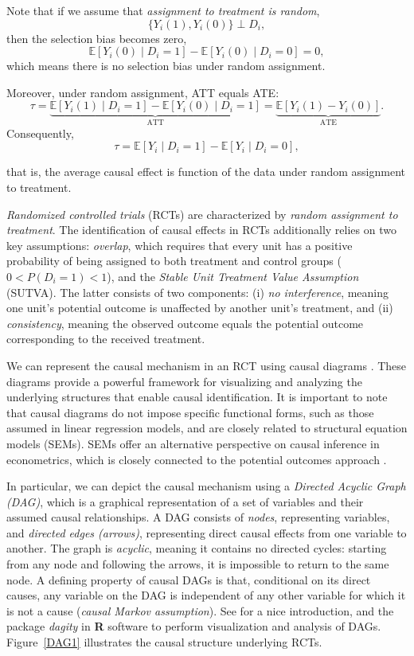 Note that if we assume that \textit{assignment to treatment is random},
\[
\{ Y_i(1), Y_i(0) \} \perp D_i,
\]
then the selection bias becomes zero,
\[
\mathbb{E}[Y_i(0) \mid D_i = 1] - \mathbb{E}[Y_i(0) \mid D_i = 0] = 0,
\]
which means there is no selection bias under random assignment.

Moreover, under random assignment, ATT equals ATE:
\[
\tau = \underbrace{\mathbb{E}[Y_i(1)\mid D_i=1]-\mathbb{E}[Y_i(0)\mid D_i=1]}_{\text{ATT}} 
= \underbrace{\mathbb{E}[Y_i(1)-Y_i(0)]}_{\text{ATE}}.
\]
Consequently,
\begin{equation}
	\tau=\mathbb{E}[Y_i \mid D_i = 1] - \mathbb{E}[Y_i \mid D_i = 0],
\end{equation}

that is, the average causal effect is function of the data under random assignment to treatment.
 
\textit{Randomized controlled trials} (RCTs) are characterized by \textit{random assignment to treatment}. The identification of causal effects in RCTs additionally relies on two key assumptions: \textit{overlap}, which requires that every unit has a positive probability of being assigned to both treatment and control groups ($0 < P(D_i = 1) < 1$), and the \textit{Stable Unit Treatment Value Assumption} (SUTVA). The latter consists of two components: (i) \textit{no interference}, meaning one unit’s potential outcome is unaffected by another unit’s treatment, and (ii) \textit{consistency}, meaning the observed outcome equals the potential outcome corresponding to the received treatment.

We can represent the causal mechanism in an RCT using causal diagrams \cite{pearl1995causal,pearl2018book}. These diagrams provide a powerful framework for visualizing and analyzing the underlying structures that enable causal identification. It is important to note that causal diagrams do not impose specific functional forms, such as those assumed in linear regression models, and are closely related to structural equation models (SEMs). SEMs offer an alternative perspective on causal inference in econometrics, which is closely connected to the potential outcomes approach \cite{haavelmo1943statistical,marschak1944random,imbens2014ivperspective}.

In particular, we can depict the causal mechanism using a \textit{Directed Acyclic Graph (DAG)}, which is a graphical representation of a set of variables and their assumed causal relationships. A DAG consists of \textit{nodes}, representing variables, and \textit{directed edges (arrows)}, representing direct causal effects from one variable to another. The graph is \textit{acyclic}, meaning it contains no directed cycles: starting from any node and following the arrows, it is impossible to return to the same node. A defining property of causal DAGs
is that, conditional on its direct causes, any variable on the DAG is independent
of any other variable for which it is not a cause (\textit{causal Markov assumption}). See \cite{hernan2020causal} for a nice introduction, and the package \textit{dagity} in \textbf{R} software to perform visualization and analysis of DAGs. Figure~\ref{DAG1} illustrates the causal structure underlying RCTs.

